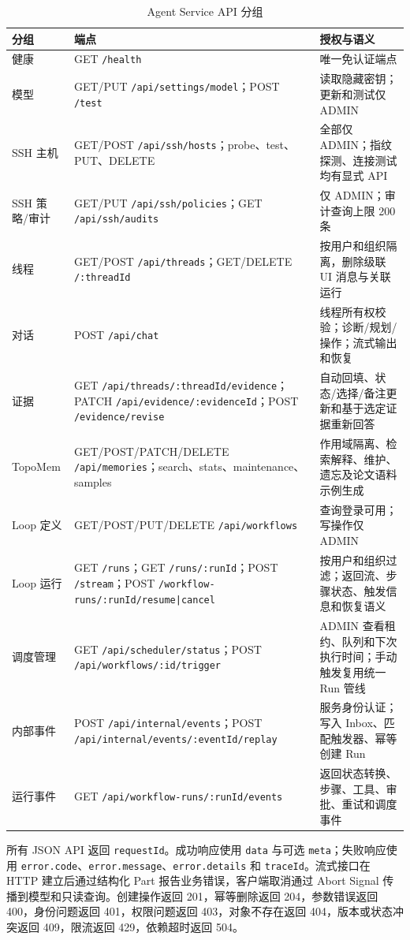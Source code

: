 \documentclass[conference,10pt]{IEEEtran}
\newcommand{\code}[1]{\texttt{#1}}
\begin{document}
\begin{table}[t]
\caption{Agent Service API 分组}
\label{tab:agent-api}
\centering
\small
\begin{tabularx}{\textwidth}{p{2.1cm}p{5.5cm}Y}
\toprule
\textbf{分组} & \textbf{端点} & \textbf{授权与语义} \\
\midrule
健康 & GET \code{/health} & 唯一免认证端点 \\
模型 & GET/PUT \code{/api/settings/model}；POST \code{/test} & 读取隐藏密钥；更新和测试仅 ADMIN \\
SSH 主机 & GET/POST \code{/api/ssh/hosts}；probe、test、PUT、DELETE & 全部仅 ADMIN；指纹探测、连接测试均有显式 API \\
SSH 策略/审计 & GET/PUT \code{/api/ssh/policies}；GET \code{/api/ssh/audits} & 仅 ADMIN；审计查询上限 200 条 \\
线程 & GET/POST \code{/api/threads}；GET/DELETE \code{/:threadId} & 按用户和组织隔离，删除级联 UI 消息与关联运行 \\
对话 & POST \code{/api/chat} & 线程所有权校验；诊断/规划/操作；流式输出和恢复 \\
证据 & GET \code{/api/threads/:threadId/evidence}；PATCH \code{/api/evidence/:evidenceId}；POST \code{/evidence/revise} & 自动回填、状态/选择/备注更新和基于选定证据重新回答 \\
TopoMem & GET/POST/PATCH/DELETE \code{/api/memories}；search、stats、maintenance、samples & 作用域隔离、检索解释、维护、遗忘及论文语料示例生成 \\
Loop 定义 & GET/POST/PUT/DELETE \code{/api/workflows} & 查询登录可用；写操作仅 ADMIN \\
Loop 运行 & GET \code{/runs}；GET \code{/runs/:runId}；POST \code{/stream}；POST \code{/workflow-runs/:runId/resume|cancel} & 按用户和组织过滤；返回流、步骤状态、触发信息和恢复语义 \\
调度管理 & GET \code{/api/scheduler/status}；POST \code{/api/workflows/:id/trigger} & ADMIN 查看租约、队列和下次执行时间；手动触发复用统一 Run 管线 \\
内部事件 & POST \code{/api/internal/events}；POST \code{/api/internal/events/:eventId/replay} & 服务身份认证；写入 Inbox、匹配触发器、幂等创建 Run \\
运行事件 & GET \code{/api/workflow-runs/:runId/events} & 返回状态转换、步骤、工具、审批、重试和调度事件 \\
\bottomrule
\end{tabularx}
\end{table}

所有 JSON API 返回 \code{requestId}。成功响应使用 \code{data} 与可选 \code{meta}；失败响应使用 \code{error.code}、\code{error.message}、\code{error.details} 和 \code{traceId}。流式接口在 HTTP 建立后通过结构化 Part 报告业务错误，客户端取消通过 Abort Signal 传播到模型和只读查询。创建操作返回 201，幂等删除返回 204，参数错误返回 400，身份问题返回 401，权限问题返回 403，对象不存在返回 404，版本或状态冲突返回 409，限流返回 429，依赖超时返回 504。
\end{document}
